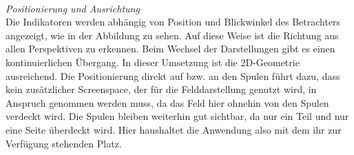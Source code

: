 \vspace{8px}
\begin{center}
	\\
\end{center}
\vspace{6px}
\textit{Positionierung und Ausrichtung}\\
Die Indikatoren werden abhängig von Position und Blickwinkel des Betrachters angezeigt, wie in der Abbildung zu sehen. Auf diese Weise ist die Richtung aus allen Perspektiven zu erkennen. Beim Wechsel der Darstellungen gibt es einen kontinuierlichen Übergang. In dieser Umsetzung ist die 2D-Geometrie ausreichend. Die Positionierung direkt auf bzw. an den Spulen führt dazu, dass kein zusätzlicher Screenspace, der für die Felddarstellung genutzt wird, in Anspruch genommen werden muss, da das Feld hier ohnehin von den Spulen verdeckt wird. Die Spulen bleiben weiterhin gut sichtbar, da nur ein Teil und nur eine Seite überdeckt wird. Hier haushaltet die Anwendung also mit dem ihr zur Verfügung stehenden Platz.\\

